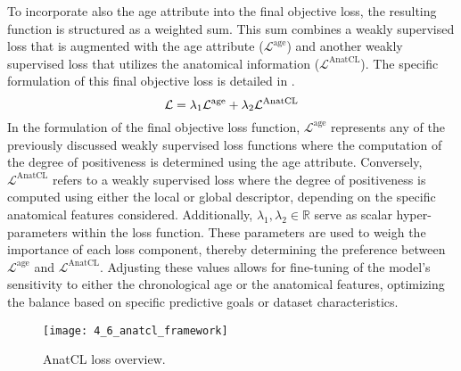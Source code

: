To incorporate also the age attribute into the final objective loss, the
resulting function is structured as a weighted sum. This sum combines a weakly
supervised loss that is augmented with the age attribute
($\mathcal{L}^{\text{age}}$) and another weakly supervised loss that utilizes
the anatomical information ($\mathcal{L}^{\text{AnatCL}}$). The specific
formulation of this final objective loss is detailed in .
\begin{equation}
    \labeq{4_10}
    \mathcal{L} = \lambda_1 \mathcal{L}^{\text{age}} + \lambda_2 \mathcal{L}^{\text{AnatCL}}
\end{equation}
In the formulation of the final objective loss function,
$\mathcal{L}^{\text{age}}$ represents any of the previously discussed weakly
supervised loss functions where the computation of the degree of positiveness is
determined using the age attribute. Conversely, $\mathcal{L}^{\text{AnatCL}}$
refers to a weakly supervised loss where the degree of positiveness is computed
using either the local or global descriptor, depending on the specific
anatomical features considered.
Additionally, $\lambda_1, \lambda_2 \in \mathbb{R}$ serve as scalar
hyper-parameters within the loss function. These parameters are used to weigh
the importance of each loss component, thereby determining the preference
between \(\mathcal{L}^{\text{age}}\) and \(\mathcal{L}^{\text{AnatCL}}\).
Adjusting these values allows for fine-tuning of the model's sensitivity to
either the chronological age or the anatomical features, optimizing the balance
based on specific predictive goals or dataset characteristics. 
\begin{figure}
    \texttt{[image: 4\_6\_anatcl\_framework]}
    \caption[AnatCL Loss Overview]{AnatCL loss overview.}
\end{figure}